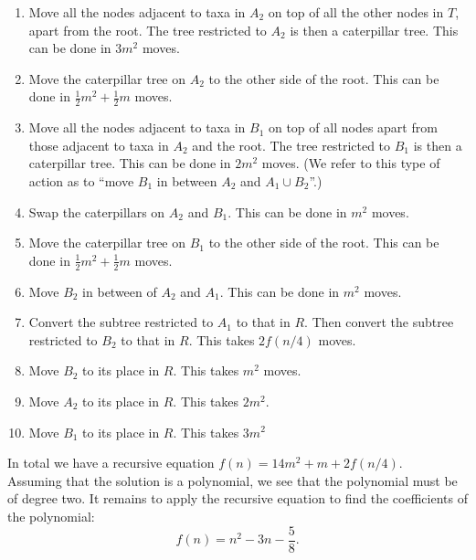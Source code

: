\documentclass{amsart}
\theoremstyle{definition}
\begin{document}
\begin{enumerate}[(1)]
\item Move all the nodes adjacent to taxa in $A_2$ on top of all the other nodes in $T$, apart from the root.
The tree restricted to $A_2$ is then a caterpillar tree.
This can be done in $3m^2$ moves.

\item Move the caterpillar tree on $A_2$ to the other side of the root.
This can be done in $\frac12 m^2 + \frac12 m$ moves.

\item Move all the nodes adjacent to taxa in $B_1$ on top of all nodes apart from those adjacent to taxa in $A_2$ and the root.
The tree restricted to $B_1$ is then a caterpillar tree.
This can be done in $2m^2$ moves.
(We refer to this type of action as to ``move $B_1$ in between $A_2$ and $A_1 \cup B_2$''.)

\item Swap the caterpillars on $A_2$ and $B_1$.
This can be done in $m^2$ moves.

\item Move the caterpillar tree on $B_1$ to the other side of the root.
This can be done in $\frac12 m^2 + \frac12 m$ moves.

\item Move $B_2$ in between of $A_2$ and $A_1$.
This can be done in $m^2$ moves.

\item Convert the subtree restricted to $A_1$ to that in $R$.
Then convert the subtree restricted to $B_2$ to that in $R$.
This takes $2f(n/4)$ moves.

\item Move $B_2$ to its place in $R$.
This takes $m^2$ moves.

\item Move $A_2$ to its place in $R$.
This takes $2m^2$.

\item Move $B_1$ to its place in $R$.
This takes $3m^2$
\end{enumerate}

In total we have a recursive equation $f(n) = 14m^2 + m + 2 f(n/4)$.\\
Assuming that the solution is a polynomial, we see that the polynomial must be of degree two.
It remains to apply the recursive equation to find the coefficients of the polynomial:
\[
f(n) = n^2 - 3n - \frac 58.
\]
\end{document}
